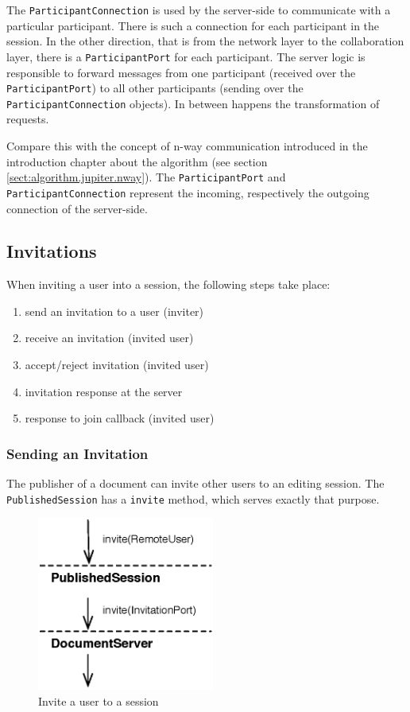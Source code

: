 The \texttt{Participant\-Connection} is used by the server-side to communicate
with a particular participant. There is such a connection for each
participant in the session. In the other direction, that is from the
network layer to the collaboration layer, there is a 
\texttt{Participant\-Port} for each participant. The server logic is
responsible to forward messages from one participant (received over the
\texttt{Participant\-Port}) to all other participants (sending over the
\texttt{Participant\-Connection} objects). In between happens the transformation
of requests.

Compare this with the concept of n-way communication introduced in the
introduction chapter about the algorithm 
(see section \ref{sect:algorithm.jupiter.nway}). The 
\texttt{Participant\-Port} and \texttt{Participant\-Connection} represent the
incoming, respectively the outgoing connection of the server-side.


\subsection{Invitations}
When inviting a user into a session, the following steps take place:
\begin{enumerate}
 \item send an invitation to a user (inviter)
 \item receive an invitation (invited user)
 \item accept/reject invitation (invited user)
 \item invitation response at the server 
 \item response to join callback (invited user)
\end{enumerate}

\subsubsection{Sending an Invitation}
The publisher of a document can invite other users to an editing session.
The \texttt{Published\-Session} has a \texttt{invite} method, which serves
exactly that purpose.

\begin{figure}[H]
 \centering
 \includegraphics[width=5.82cm,height=5.72cm]{../images/finalreport/architecture_flows/invite_initiate.eps}
 \caption{Invite a user to a session}
 \label{fig:archoverview.flow.inviteinitiate}
\end{figure}

